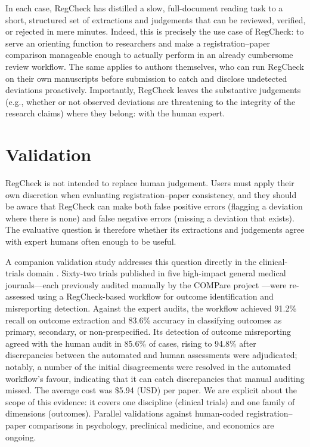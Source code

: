 \documentclass{article}
\begin{document}
In each case, RegCheck has distilled a slow, full-document reading task to a
short, structured set of extractions and judgements that can be reviewed,
verified, or rejected in mere minutes. Indeed, this is precisely the use case of
RegCheck: to serve an orienting function to researchers and make a
registration--paper comparison manageable enough to actually perform in an
already cumbersome review workflow. The same applies to authors themselves, who
can run RegCheck on their own manuscripts before submission to catch and
disclose undetected deviations proactively. Importantly, RegCheck leaves the
substantive judgements (e.g., whether or not observed deviations are threatening
to the integrity of the research claims) where they belong: with the human
expert.

\section{Validation}\label{sec:validation}

RegCheck is not intended to replace human judgement. Users must apply their own
discretion when evaluating registration--paper consistency, and they should be
aware that RegCheck can make both false positive errors (flagging a deviation
where there is none) and false negative errors (missing a deviation that
exists). The evaluative question is therefore whether its extractions and
judgements agree with expert humans often enough to be useful.

A companion validation study addresses this question directly in the
clinical-trials domain \citep{cummins_automating_2026}. Sixty-two trials
published in five high-impact general medical journals---each previously
audited manually by the COMPare project \citep{goldacre_compare_2019}---were
re-assessed using a RegCheck-based workflow for outcome identification and
misreporting detection. Against the expert audits, the workflow achieved 91.2\%
recall on outcome extraction and 83.6\% accuracy in classifying outcomes as
primary, secondary, or non-prespecified. Its detection of outcome misreporting
agreed with the human audit in 85.6\% of cases, rising to 94.8\% after
discrepancies between the automated and human assessments were adjudicated;
notably, a number of the initial disagreements were resolved in the automated
workflow's favour, indicating that it can catch discrepancies that manual
auditing missed. The average cost was \$5.94 (USD) per paper. We are explicit
about the scope of this evidence: it covers one discipline (clinical trials) and
one family of dimensions (outcomes). Parallel validations against human-coded
registration--paper comparisons in psychology, preclinical medicine, and
economics are ongoing.
\end{document}

